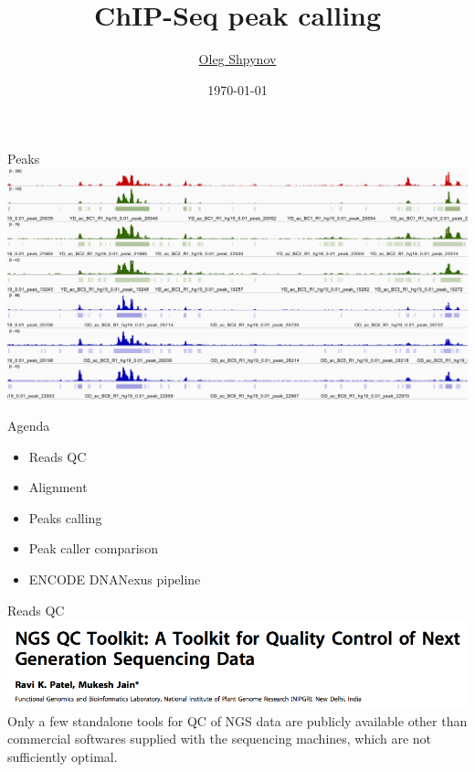 \documentclass{beamer}
\title{ChIP-Seq peak calling}
\author{\href{mailto:os@jetbrains.com}{Oleg Shpynov}}
\institute{JetBrains Biolabs}
\date{\today}
\begin{document}
\begin{frame}
  \titlepage
\end{frame}

\begin{frame}{Peaks}
\includegraphics[width=\linewidth]{peaks.png}
\end{frame}

\begin{frame}{Agenda}
\begin{itemize}
	\item Reads QC
	\item Alignment
	\item Peaks calling
	\item Peak caller comparison
	\item ENCODE DNANexus pipeline
\end{itemize}
\end{frame}

\begin{frame}{Reads QC}
\includegraphics[width=\linewidth]{ngstoolkit.png}\\
Only a few standalone tools for QC of NGS data are publicly available other than commercial softwares supplied with the sequencing machines, which are not sufficiently optimal.
\end{frame}
\end{document}
